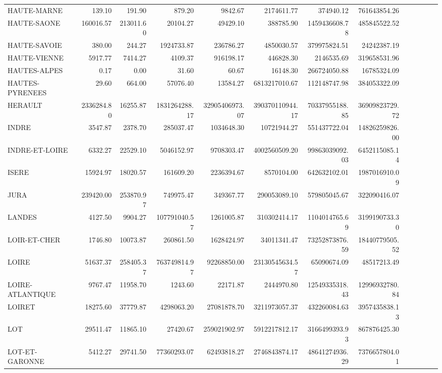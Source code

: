 \documentclass[11pt, a4paper]{article}
\begin{document}
\begin{landscape}
\begin{tabular}{lrrrrrrrrrrrr}
    HAUTE-MARNE & 139.10 & 191.90 & 879.20 & 9842.67 & 2174611.77 & 374940.12 & 761643854.26 \\ 
    HAUTE-SAONE & 160016.57 & 213011.60 & 20104.27 & 49429.10 & 388785.90 & 1459436608.78 & 485845522.52 \\ 
    HAUTE-SAVOIE & 380.00 & 244.27 & 1924733.87 & 236786.27 & 4850030.57 & 379975824.51 & 24242387.19 \\ 
    HAUTE-VIENNE & 5917.77 & 7414.27 & 4109.37 & 916198.17 & 446828.30 & 2146535.69 & 319658531.96 \\ 
    HAUTES-ALPES & 0.17 & 0.00 & 31.60 & 60.67 & 16148.30 & 266724050.88 & 16785324.09 \\ 
    HAUTES-PYRENEES & 29.60 & 664.00 & 57076.40 & 13584.27 & 6813217010.67 & 112148747.98 & 384053322.09 \\ 
    HERAULT & 2336284.80 & 16255.87 & 1831264288.17 & 32905406973.07 & 390370110944.17 & 70337955188.85 & 36909823729.72 \\ 
    INDRE & 3547.87 & 2378.70 & 285037.47 & 1034648.30 & 10721944.27 & 551437722.04 & 14826259826.00 \\ 
    INDRE-ET-LOIRE & 6332.27 & 22529.10 & 5046152.97 & 9708303.47 & 4002560509.20 & 99863039092.03 & 6452115085.14 \\ 
    ISERE & 15924.97 & 18020.57 & 161609.20 & 2236394.67 & 8570104.00 & 642632102.01 & 1987016910.09 \\ 
    JURA & 239420.00 & 253870.97 & 749975.47 & 349367.77 & 290053089.10 & 579805045.67 & 322090416.07 \\ 
    LANDES & 4127.50 & 9904.27 & 107791040.57 & 1261005.87 & 310302414.17 & 1104014765.69 & 3199190733.30 \\ 
    LOIR-ET-CHER & 1746.80 & 10073.87 & 260861.50 & 1628424.97 & 34011341.47 & 73252873876.59 & 18440779505.52 \\ 
    LOIRE & 51637.37 & 258405.37 & 763749814.97 & 92268850.00 & 23130545634.57 & 65090674.09 & 48517213.49 \\
    LOIRE-ATLANTIQUE & 9767.47 & 11958.70 & 1243.60 & 22171.87 & 2444970.80 & 12549335318.43 & 12996932780.84 \\ 
    LOIRET & 18275.60 & 37779.87 & 4298063.20 & 27081878.70 & 3211973057.37 & 432260084.63 & 3957435838.13 \\ 
    LOT & 29511.47 & 11865.10 & 27420.67 & 259021902.97 & 5912217812.17 & 3166499393.93 & 867876425.30 \\ 
    LOT-ET-GARONNE & 5412.27 & 29741.50 & 77360293.07 & 62493818.27 & 2746843874.17 & 48641274936.29 & 7376657804.01 \\ 

\end{tabular}
\end{landscape}
\end{document}
